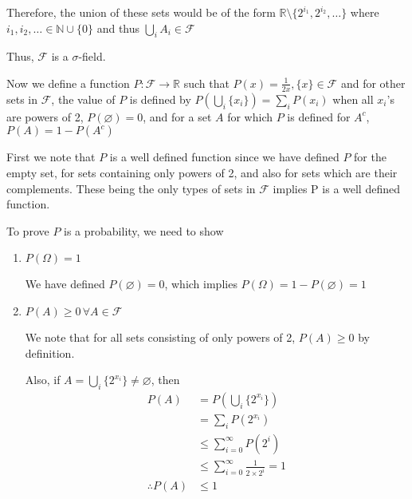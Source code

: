 \documentclass[12pt, oneside]{article}
\begin{document}
\begin{enumerate}
{\begin{enumerate}
{            Therefore, the union of these sets would be of the form \(\mathbb{R} \setminus \{2^{i_1}, 2^{i_2}, \ldots\}\)
            where \(i_1, i_2, \ldots \in \mathbb{N} \cup \{0\}\) and thus \(\bigcup_{i}A_i \in \mathcal{F}\)
        }
    \end{enumerate}

    Thus, \(\mathcal{F}\) is a \(\sigma\)-field.

    Now we define a function \(P: \mathcal{F} \to \mathbb{R}\) such that
    \(P(x) = \frac{1}{2x}, \{x\} \in \mathcal{F}\) and for other sets in \(\mathcal{F}\),
    the value of \(P\) is defined by \(P\left(\bigcup_{i} \{x_i\}\right) = \sum_{i} P(x_i)\)
    when all \(x_i\)'s are powers of 2, \(P(\varnothing) = 0\), and for a set \(A\) for which
    \(P\) is defined for \(A^c\), \(P(A) = 1 - P(A^c)\)

    First we note that \(P\) is a well defined function since we have defined \(P\) for 
    the empty set, for sets containing only powers of 2, and also for sets which are their
    complements. These being the only types of sets in \(\mathcal{F}\) implies P is a well
    defined function.

    To prove \(P\) is a probability, we need to show
    \begin{enumerate}
        \item {
            \(P(\Omega) = 1\)

            We have defined \(P(\varnothing) = 0\), which implies 
            \(P(\Omega) = 1 - P(\varnothing) = 1\)
        }
        \item {
            \(P(A) \geq 0 \, \forall A \in \mathcal{F}\)

            We note that for all sets consisting of only powers of 2, \(P(A) \geq 0\)
            by definition.
            
            Also, if \(A = \bigcup_{i} \{2^{x_i}\} \neq \varnothing\), then
            \begin{align*}
                P(A) &= P\left(\bigcup_{i} \{2^{x_i}\}\right) \\
                     &= \sum_{i} P(2^{x_i}) \tag*{(By definition)}\\
                     &\leq \sum_{i=0}^{\infty} P(2^i) \\
                     &\leq \sum_{i=0}^{\infty} \frac{1}{2 \times 2^i} = 1\\
                \therefore P(A) &\leq 1
            \end{align*}

}
\end{enumerate}}
\end{enumerate}
\end{document}
